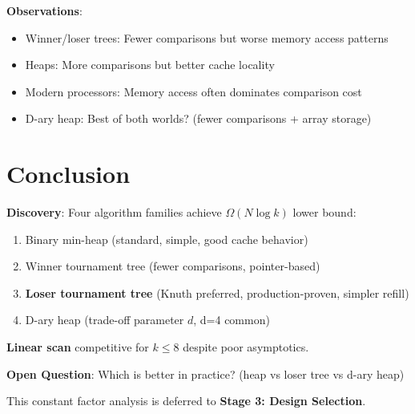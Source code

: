 \documentclass[11pt]{article}
\begin{document}
\textbf{Observations}:
\begin{itemize}
    \item Winner/loser trees: Fewer comparisons but worse memory access patterns
    \item Heaps: More comparisons but better cache locality
    \item Modern processors: Memory access often dominates comparison cost
    \item D-ary heap: Best of both worlds? (fewer comparisons + array storage)
\end{itemize}

\section{Conclusion}

\textbf{Discovery}: Four algorithm families achieve $\Omega(N \log k)$ lower bound:
\begin{enumerate}
    \item Binary min-heap (standard, simple, good cache behavior)
    \item Winner tournament tree (fewer comparisons, pointer-based)
    \item \textbf{Loser tournament tree} (Knuth preferred, production-proven, simpler refill)
    \item D-ary heap (trade-off parameter $d$, d=4 common)
\end{enumerate}

\textbf{Linear scan} competitive for $k \leq 8$ despite poor asymptotics.

\textbf{Open Question}: Which is better in practice? (heap vs loser tree vs d-ary heap)

This constant factor analysis is deferred to \textbf{Stage 3: Design Selection}.
\end{document}
